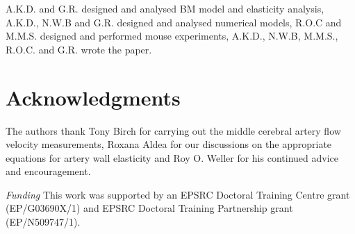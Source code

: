 \documentclass{frontiersFPHY} %
\begin{document}
A.K.D. and G.R. designed and analysed BM model and elasticity analysis, A.K.D., N.W.B and G.R. designed and analysed numerical models, R.O.C and M.M.S. designed and performed mouse experiments, A.K.D., N.W.B, M.M.S., R.O.C. and G.R. wrote the paper.


\section*{Acknowledgments}
The authors thank Tony Birch for carrying out the middle cerebral artery flow velocity measurements, Roxana Aldea for our discussions on the appropriate equations for artery wall elasticity and Roy O. Weller for his continued advice and encouragement.


\textit{Funding\textcolon} This work was supported by an EPSRC Doctoral Training Centre grant (EP/G03690X/1) and EPSRC Doctoral Training Partnership grant (EP/N509747/1).
\end{document}

